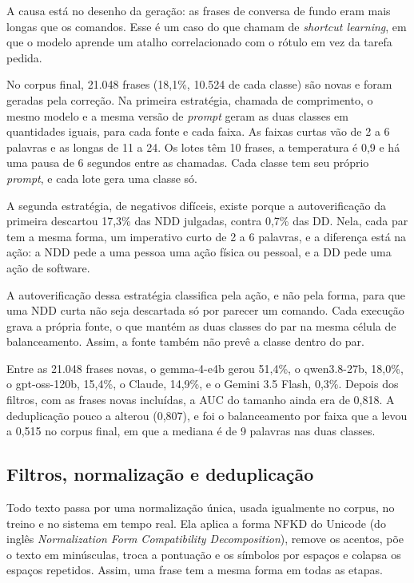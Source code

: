 \documentclass[
    12pt,                %
    openright,           %
    oneside,             %
    a4paper,             %
    english,             %
    brazil               %
]{abntex2}
\begin{document}
A causa está no desenho da geração: as frases de conversa de fundo eram mais longas que os comandos. Esse é um caso do que  chamam de \textit{shortcut learning}, em que o modelo aprende um atalho correlacionado com o rótulo em vez da tarefa pedida.

No corpus final, 21.048 frases (18,1\%, 10.524 de cada classe) são novas e foram geradas pela correção. Na primeira estratégia, chamada de comprimento, o mesmo modelo e a mesma versão de \textit{prompt} geram as duas classes em quantidades iguais, para cada fonte e cada faixa. As faixas curtas vão de 2 a 6 palavras e as longas de 11 a 24. Os lotes têm 10 frases, a temperatura é 0,9 e há uma pausa de 6 segundos entre as chamadas. Cada classe tem seu próprio \textit{prompt}, e cada lote gera uma classe só.

A segunda estratégia, de negativos difíceis, existe porque a autoverificação da primeira descartou 17,3\% das NDD julgadas, contra 0,7\% das DD. Nela, cada par tem a mesma forma, um imperativo curto de 2 a 6 palavras, e a diferença está na ação: a NDD pede a uma pessoa uma ação física ou pessoal, e a DD pede uma ação de software.

A autoverificação dessa estratégia classifica pela ação, e não pela forma, para que uma NDD curta não seja descartada só por parecer um comando. Cada execução grava a própria fonte, o que mantém as duas classes do par na mesma célula de balanceamento. Assim, a fonte também não prevê a classe dentro do par.

Entre as 21.048 frases novas, o gemma-4-e4b gerou 51,4\%, o qwen3.8-27b, 18,0\%, o gpt-oss-120b, 15,4\%, o Claude, 14,9\%, e o Gemini 3.5 Flash, 0,3\%. Depois dos filtros, com as frases novas incluídas, a AUC do tamanho ainda era de 0,818. A deduplicação pouco a alterou (0,807), e foi o balanceamento por faixa que a levou a 0,515 no corpus final, em que a mediana é de 9 palavras nas duas classes.


\subsection{Filtros, normalização e deduplicação}
\label{sec:filtros}

Todo texto passa por uma normalização única, usada igualmente no corpus, no treino e no sistema em tempo real. Ela aplica a forma NFKD do Unicode (do inglês \textit{Normalization Form Compatibility Decomposition}), remove os acentos, põe o texto em minúsculas, troca a pontuação e os símbolos por espaços e colapsa os espaços repetidos. Assim, uma frase tem a mesma forma em todas as etapas.
\end{document}
